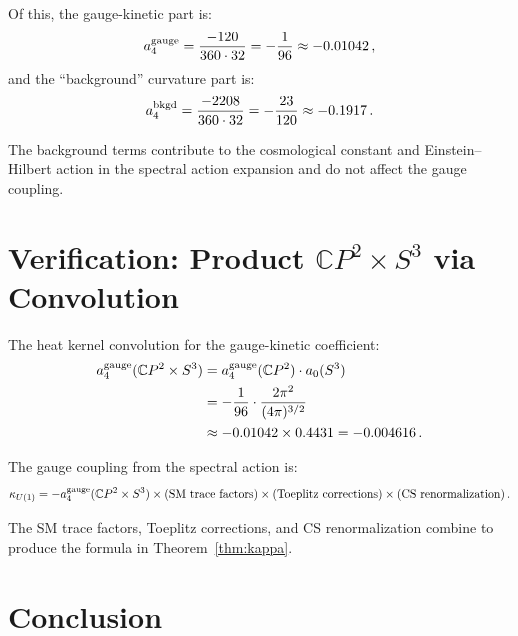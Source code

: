 \documentclass[12pt,a4paper]{article}
\theoremstyle{definition}
\begin{document}
Of this, the gauge-kinetic part is:
\begin{equation}
a_4^{\rm gauge} = \frac{-120}{360 \cdot 32} = -\frac{1}{96} \approx -0.01042\,,
\end{equation}
and the ``background'' curvature part is:
\begin{equation}
a_4^{\rm bkgd} = \frac{-2208}{360 \cdot 32} = -\frac{23}{120} \approx -0.1917\,.
\end{equation}

The background terms contribute to the cosmological constant and
Einstein--Hilbert action in the spectral action expansion and do not
affect the gauge coupling.

\section{Verification: Product $\mathbb{C}P^2 \times S^3$ via Convolution}
\label{sec:product-verify}

The heat kernel convolution for the gauge-kinetic coefficient:
\begin{align}
a_4^{\rm gauge}(\mathbb{C}P^2 \times S^3)
&= a_4^{\rm gauge}(\mathbb{C}P^2)\cdot a_0(S^3) \nonumber\\
&= -\frac{1}{96}\cdot\frac{2\pi^2}{(4\pi)^{3/2}} \nonumber\\
&\approx -0.01042 \times 0.4431 = -0.004616\,.
\end{align}

The gauge coupling from the spectral action is:
\begin{equation}
\kappa_{U(1)} = -a_4^{\rm gauge}(\mathbb{C}P^2 \times S^3)
\times (\text{SM trace factors}) \times (\text{Toeplitz corrections})
\times (\text{CS renormalization})\,.
\end{equation}

The SM trace factors, Toeplitz corrections, and CS renormalization
combine to produce the formula in Theorem~\ref{thm:kappa}.

\section{Conclusion}
\label{sec:conclusion}
\end{document}
